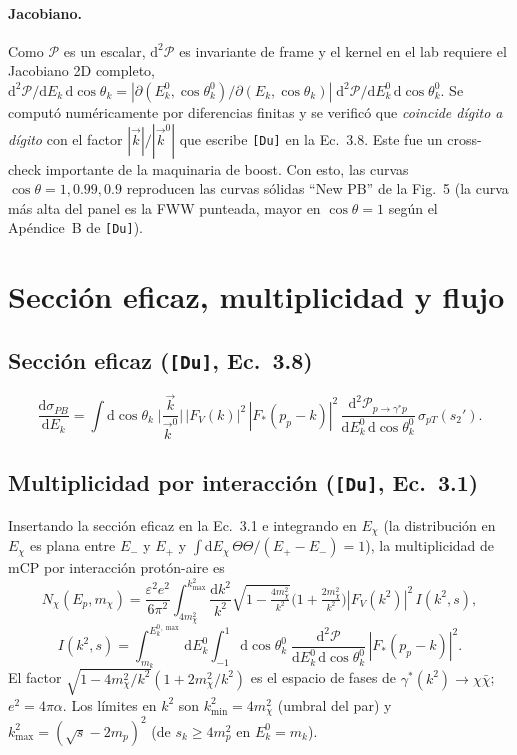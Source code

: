 \documentclass[11pt,a4paper]{article}
\newcommand{\mchi}{m_\chi}
\newcommand{\eps}{\varepsilon}
\newcommand{\Ek}{E_k}
\newcommand{\Ekz}{E_k^0}
\newcommand{\cosz}{\cos\theta_k^0}
\newcommand{\gammastar}{\gamma^\ast}
\newcommand{\dd}{\mathrm{d}}
\newcommand{\Du}{\texttt{[Du]}}
\begin{document}
\paragraph{Jacobiano.} Como $\mathcal{P}$ es un escalar, $\dd^2\mathcal{P}$ es
invariante de frame y el kernel en el lab requiere el Jacobiano 2D completo,
$\dd^2\mathcal{P}/\dd\Ek\,\dd\cos\theta_k=
|\partial(\Ekz,\cosz)/\partial(\Ek,\cos\theta_k)|\;
\dd^2\mathcal{P}/\dd\Ekz\,\dd\cosz$. Se comput\'o num\'ericamente por
diferencias finitas y se verific\'o que \emph{coincide d\'igito a d\'igito}
con el factor $|\vec k|/|\vec k^0|$ que escribe \Du{} en la Ec.~3.8. Este fue
un cross-check importante de la maquinaria de boost. Con esto, las curvas
$\cos\theta=1,0.99,0.9$ reproducen las curvas s\'olidas ``New PB'' de la
Fig.~5 (la curva m\'as alta del panel es la FWW punteada, mayor en
$\cos\theta=1$ seg\'un el Ap\'endice~B de \Du).

\section{Secci\'on eficaz, multiplicidad y flujo}

\subsection{Secci\'on eficaz (\Du, Ec.~3.8)}
\begin{equation}
\frac{\dd\sigma_{PB}}{\dd\Ek}
=\int \dd\cos\theta_k\;\Big|\frac{\vec k}{\vec k^0}\Big|\,
|F_V(k)|^2\,|F_\ast(p_p-k)|^2\,
\frac{\dd^2\mathcal{P}_{p\to\gammastar p}}{\dd\Ekz\,\dd\cosz}\,
\sigma_{pT}(s_2') .
\end{equation}

\subsection{Multiplicidad por interacci\'on (\Du, Ec.~3.1)}

Insertando la secci\'on eficaz en la Ec.~3.1 e integrando en $E_\chi$ (la
distribuci\'on en $E_\chi$ es plana entre $E_-$ y $E_+$ y
$\int \dd E_\chi\,\Theta\Theta/(E_+-E_-)=1$), la multiplicidad de mCP por
interacci\'on prot\'on-aire es
\begin{equation}
N_\chi(E_p,\mchi)=\frac{\eps^2 e^2}{6\pi^2}
\int_{4\mchi^2}^{k^2_{\max}}\!\frac{\dd k^2}{k^2}
\sqrt{1-\tfrac{4\mchi^2}{k^2}}\Big(1+\tfrac{2\mchi^2}{k^2}\Big)
|F_V(k^2)|^2\,I(k^2,s),
\label{eq:mult}
\end{equation}
\begin{equation}
I(k^2,s)=\int_{m_k}^{\Ekz{}^{,\max}}\!\!\dd\Ekz
\int_{-1}^{1}\!\dd\cosz\;
\frac{\dd^2\mathcal{P}}{\dd\Ekz\,\dd\cosz}\,|F_\ast(p_p-k)|^2 .
\label{eq:inner}
\end{equation}
El factor $\sqrt{1-4\mchi^2/k^2}(1+2\mchi^2/k^2)$ es el espacio de fases de
$\gammastar(k^2)\to\chi\bar\chi$; $e^2=4\pi\alpha$. Los l\'imites en $k^2$ son
$k^2_{\min}=4\mchi^2$ (umbral del par) y $k^2_{\max}=(\sqrt{s}-2m_p)^2$ (de
$s_k\ge4m_p^2$ en $\Ekz=m_k$).
\end{document}
